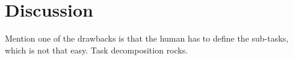 \section{Discussion}
Mention one of the drawbacks is that the human has to define the sub-tasks,
which is not that easy.
Task decomposition rocks.
